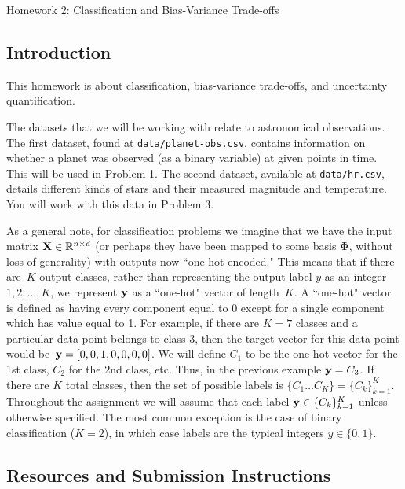 \documentclass[submit]{harvardml}
\begin{document}
\begin{center}
{\Large Homework 2: Classification and Bias-Variance Trade-offs}\\
\end{center}

\subsection*{Introduction}

This homework is about classification, bias-variance trade-offs, and
uncertainty quantification.

The datasets that we will be working with relate to astronomical
observations. The first dataset, found at \verb|data/planet-obs.csv|,
contains information on whether a planet was observed (as a binary
variable) at given points in time. This will be used in Problem 1. The
second dataset, available at \verb|data/hr.csv|, details different
kinds of stars and their measured magnitude and temperature. You will
work with this data in Problem 3.

As a general note, for classification problems we imagine that we have
the input matrix $\mathbf{X} \in \mathbb{R}^{n \times d}$ (or perhaps they
have been mapped to some basis $\bm{\Phi}$, without loss of
generality) with outputs now ``one-hot encoded."  This means that if
there are~$K$ output classes, rather than representing the output
label $y$ as an integer~${1,2,\ldots,K}$, we represent $\mathbf{y}$ as a
``one-hot" vector of length~$K$. A ``one-hot" vector is defined as
having every component equal to 0 except for a single component which
has value equal to 1.  For example, if there are $K = 7$ classes and a
particular data point belongs to class 3, then the target vector for
this data point would be~$\mathbf{y} = [0,0,1,0,0,0,0]$.  We will define
$C_1$ to be the one-hot vector for the 1st class, $C_2$ for the 2nd
class, etc.  Thus, in the previous example $\mathbf{y} = C_3$. If there
are $K$ total classes, then the set of possible labels is $\{C_1
\ldots C_K \} = \{C_k\}_{k=1}^K$.  Throughout the assignment we will
assume that each label $\mathbf{y} \in \{C_k\}_{k=1}^K$ unless otherwise
specified. The most common exception is the case of binary
classification ($K = 2$), in which case labels are the typical
integers $y \in \{0, 1\}$.

\subsection*{Resources and Submission Instructions}
\end{document}

